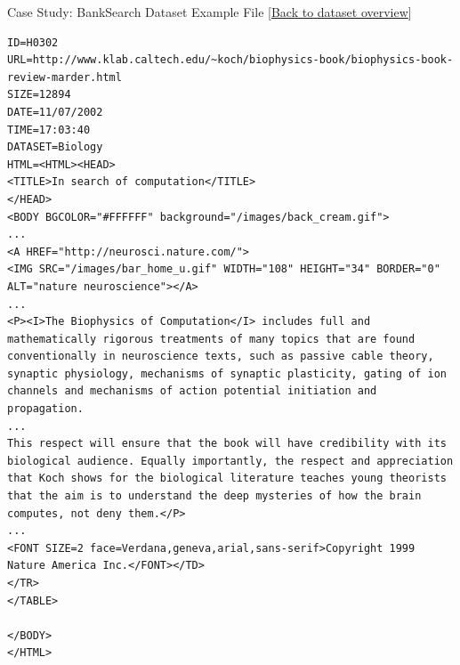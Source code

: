 \begin{frame}[fragile]{Case Study: BankSearch Dataset Example File {\tiny[\hyperlink{main:dataset-overview}{Back to dataset overview}]}}

\begin{lstlisting}[language=BankSearchHTML,basicstyle=\ttfamily\tiny]
ID=H0302
URL=http://www.klab.caltech.edu/~koch/biophysics-book/biophysics-book-review-marder.html
SIZE=12894
DATE=11/07/2002
TIME=17:03:40
DATASET=Biology
HTML=<HTML><HEAD>
<TITLE>In search of computation</TITLE>
</HEAD>
<BODY BGCOLOR="#FFFFFF" background="/images/back_cream.gif">
...
<A HREF="http://neurosci.nature.com/">
<IMG SRC="/images/bar_home_u.gif" WIDTH="108" HEIGHT="34" BORDER="0" ALT="nature neuroscience"></A>
...
<P><I>The Biophysics of Computation</I> includes full and mathematically rigorous treatments of many topics that are found conventionally in neuroscience texts, such as passive cable theory, synaptic physiology, mechanisms of synaptic plasticity, gating of ion channels and mechanisms of action potential initiation and propagation.
...
This respect will ensure that the book will have credibility with its biological audience. Equally importantly, the respect and appreciation that Koch shows for the biological literature teaches young theorists that the aim is to understand the deep mysteries of how the brain computes, not deny them.</P>
...
<FONT SIZE=2 face=Verdana,geneva,arial,sans-serif>Copyright 1999 Nature America Inc.</FONT></TD>
</TR>
</TABLE>

</BODY>
</HTML>
\end{lstlisting}

\end{frame}


